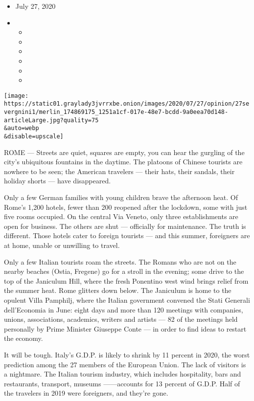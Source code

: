 \begin{itemize}
\item
  July 27, 2020
\item
  \begin{itemize}
  \item
  \item
  \item
  \item
  \item
  \item
  \end{itemize}
\end{itemize}

\texttt{[image: https://static01.graylady3jvrrxbe.onion/images/2020/07/27/opinion/27severgnini1/merlin\_174869175\_1251a1cf-017e-48e7-bcdd-9a0eea70d148-articleLarge.jpg?quality=75\\\&auto=webp\\\&disable=upscale]}

ROME --- Streets are quiet, squares are empty, you can hear the gurgling
of the city's ubiquitous fountains in the daytime. The platoons of
Chinese tourists are nowhere to be seen; the American travelers ---
their hats, their sandals, their holiday shorts --- have disappeared.

Only a few German families with young children brave the afternoon heat.
Of Rome's 1,200 hotels, fewer than 200 reopened after the lockdown, some
with just five rooms occupied. On the central Via Veneto, only three
establishments are open for business. The others are shut --- officially
for maintenance. The truth is different. Those hotels cater to foreign
tourists --- and this summer, foreigners are at home, unable or
unwilling to travel.

Only a few Italian tourists roam the streets. The Romans who are not on
the nearby beaches (Ostia, Fregene) go for a stroll in the evening; some
drive to the top of the Janiculum Hill, where the fresh Ponentino west
wind brings relief from the summer heat. Rome glitters down below. The
Janiculum is home to the opulent Villa Pamphilj, where the Italian
government convened the Stati Generali dell'Economia in June: eight days
and more than 120 meetings with companies, unions, associations,
academics, writers and artists --- 82 of the meetings held personally by
Prime Minister Giuseppe Conte --- in order to find ideas to restart the
economy.

It will be tough. Italy's G.D.P. is likely to shrink by 11 percent in
2020, the worst prediction among the 27 members of the European Union.
The lack of visitors is a nightmare. The Italian tourism industry, which
includes hospitality, bars and restaurants, transport, museums
------accounts for 13 percent of G.D.P. Half of the travelers in 2019
were foreigners, and they're gone.

